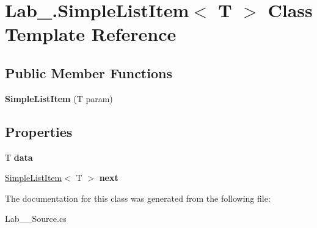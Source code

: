 \hypertarget{class_lab__3_1_1_simple_list_item}{}\section{Lab\+\_.\+Simple\+List\+Item$<$ T $>$ Class Template Reference}
\label{class_lab__3_1_1_simple_list_item}
\subsection*{Public Member Functions}
\begin{DoxyCompactItemize}
\item 
\mbox{\label{class_lab__3_1_1_simple_list_item_a2f000338a7cb0d59db8f97d3d0863da4}} 
{\bfseries Simple\+List\+Item} (T param)
\end{DoxyCompactItemize}
\subsection*{Properties}
\begin{DoxyCompactItemize}
\item 
\mbox{\label{class_lab__3_1_1_simple_list_item_afdee6166185faa715750d67cd1142787}} 
T {\bfseries data}
\item 
\mbox{\label{class_lab__3_1_1_simple_list_item_a06c3e2383cacf8d7b0d5e619c90caea2}} 
\hyperlink{class_lab__3_1_1_simple_list_item}{Simple\+List\+Item}$<$ T $>$ {\bfseries next}
\end{DoxyCompactItemize}


The documentation for this class was generated from the following file\+:\begin{DoxyCompactItemize}
\item 
Lab\+\_\+\_\+\+Source.\+cs\end{DoxyCompactItemize}
